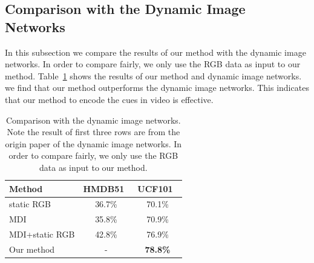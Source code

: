 \documentclass[10pt,twocolumn,letterpaper]{article}
\begin{document}
\subsection{Comparison with the Dynamic Image Networks}
In this subsection we compare the results of our method with the dynamic image networks. In order to compare fairly, we only use the RGB data as input to our method.
Table~\ref{table:compare_din} shows the results of our method and dynamic image networks. we find
that our method outperforms the dynamic image networks. This indicates that 
our method to encode the cues in video is effective. 
\begin{table}
	\begin{center}
		\begin{tabular}{|l|c|c|}
			\hline
			Method 						& HMDB51~\cite{Kuehne11} 		& UCF101~\cite{soomro2012ucf101} 	\\
			\hline
			static RGB					& 36.7\% 		& 70.1\% 	\\
			MDI				& 35.8\% 		& 70.9\% 	\\
			MDI+static RGB & 42.8\%		& 76.9\% 	\\
			Our method                  & -				& \textbf{78.8\%} \\
			\hline
		\end{tabular}
	\end{center}
	\caption{Comparison with the dynamic image networks. Note the result of first three rows are from the origin paper of the dynamic image networks. In order to compare fairly, we only use the RGB data as input to our method.}
	\label{table:compare_din}
\end{table}

\end{document}
